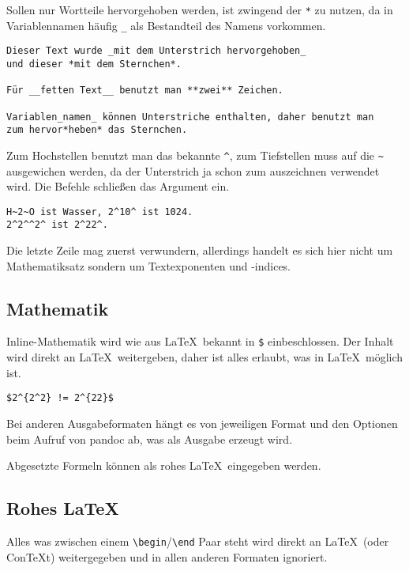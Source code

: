 \documentclass[11pt,ngerman,a4paper]{article}
\begin{document}
Sollen nur Wortteile hervorgehoben werden, ist zwingend der \texttt{*}
zu nutzen, da in Variablennamen häufig \texttt{\_} als Bestandteil des
Namens vorkommen.

\begin{verbatim}
Dieser Text wurde _mit dem Unterstrich hervorgehoben_
und dieser *mit dem Sternchen*.

Für __fetten Text__ benutzt man **zwei** Zeichen.

Variablen_namen_ können Unterstriche enthalten, daher benutzt man 
zum hervor*heben* das Sternchen.
\end{verbatim}

Zum Hochstellen benutzt man das bekannte \texttt{\^{}}, zum Tiefstellen
muss auf die \texttt{\textasciitilde{}} ausgewichen werden, da der
Unterstrich ja schon zum auszeichnen verwendet wird. Die Befehle
schließen das Argument ein.

\begin{verbatim}
H~2~O ist Wasser, 2^10^ ist 1024.
2^2^^2^ ist 2^22^.
\end{verbatim}

Die letzte Zeile mag zuerst verwundern, allerdings handelt es sich hier
nicht um Mathematiksatz sondern um Textexponenten und -indices.

\subsection{Mathematik}\label{mathematik}

Inline-Mathematik wird wie aus LaTeX~bekannt in \texttt{\$}
einbeschlossen. Der Inhalt wird direkt an LaTeX~weitergeben, daher ist
alles erlaubt, was in LaTeX~möglich ist.

\begin{verbatim}
$2^{2^2} != 2^{22}$
\end{verbatim}

Bei anderen Ausgabeformaten hängt es von jeweiligen Format und den
Optionen beim Aufruf von pandoc ab, was als Ausgabe erzeugt wird.

Abgesetzte Formeln können als rohes LaTeX~eingegeben werden.

\subsection{Rohes LaTeX}\label{rohes-latex}

Alles was zwischen einem
\texttt{\textbackslash{}begin}/\texttt{\textbackslash{}end} Paar steht
wird direkt an LaTeX~(oder ConTeXt) weitergegeben und in allen anderen
Formaten ignoriert.
\end{document}
